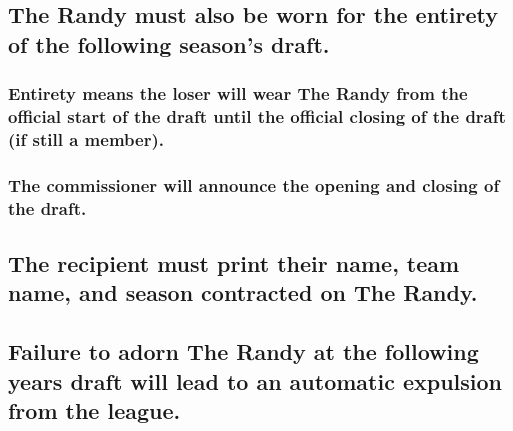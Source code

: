 \documentclass[
]{book}
\begin{document}
\hypertarget{the-randy-must-also-be-worn-for-the-entirety-of-the-following-seasons-draft.}{%
\subsection{The Randy must also be worn for the entirety of the following season's draft.}\label{the-randy-must-also-be-worn-for-the-entirety-of-the-following-seasons-draft.}}

\hypertarget{entirety-means-the-loser-will-wear-the-randy-from-the-official-start-of-the-draft-until-the-official-closing-of-the-draft-if-still-a-member.}{%
\subsubsection{Entirety means the loser will wear The Randy from the official start of the draft until the official closing of the draft (if still a member).}\label{entirety-means-the-loser-will-wear-the-randy-from-the-official-start-of-the-draft-until-the-official-closing-of-the-draft-if-still-a-member.}}

\hypertarget{the-commissioner-will-announce-the-opening-and-closing-of-the-draft.}{%
\subsubsection{The commissioner will announce the opening and closing of the draft.}\label{the-commissioner-will-announce-the-opening-and-closing-of-the-draft.}}

\hypertarget{the-recipient-must-print-their-name-team-name-and-season-contracted-on-the-randy.}{%
\subsection{The recipient must print their name, team name, and season contracted on The Randy.}\label{the-recipient-must-print-their-name-team-name-and-season-contracted-on-the-randy.}}

\hypertarget{failure-to-adorn-the-randy-at-the-following-years-draft-will-lead-to-an-automatic-expulsion-from-the-league.}{%
\subsection{Failure to adorn The Randy at the following years draft will lead to an automatic expulsion from the league.}\label{failure-to-adorn-the-randy-at-the-following-years-draft-will-lead-to-an-automatic-expulsion-from-the-league.}}
\end{document}
